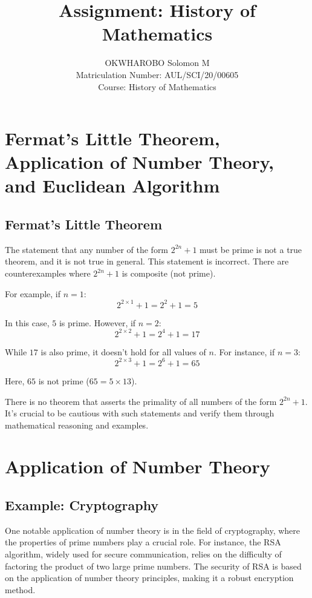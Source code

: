 \documentclass{article}
\begin{document}
\title{Assignment: History of Mathematics}
\author{OKWHAROBO Solomon M \\
        Matriculation Number: AUL/SCI/20/00605 \\
        Course: History of Mathematics}
\date{}
\maketitle

\section*{Fermat's Little Theorem, Application of Number Theory, and Euclidean Algorithm}

\subsection{Fermat's Little Theorem}

The statement that any number of the form $2^{2n} + 1$ must be prime is not a true theorem, and it is not true in general. This statement is incorrect. There are counterexamples where $2^{2n} + 1$ is composite (not prime).

For example, if $n = 1$:
\[2^{2 \times 1} + 1 = 2^2 + 1 = 5\]

In this case, $5$ is prime. However, if $n = 2$:
\[2^{2 \times 2} + 1 = 2^4 + 1 = 17\]

While $17$ is also prime, it doesn't hold for all values of $n$. For instance, if $n = 3$:
\[2^{2 \times 3} + 1 = 2^6 + 1 = 65\]

Here, $65$ is not prime ($65 = 5 \times 13$).

There is no theorem that asserts the primality of all numbers of the form $2^{2n} + 1$. It's crucial to be cautious with such statements and verify them through mathematical reasoning and examples.
\section{Application of Number Theory}

\subsection{Example: Cryptography}

One notable application of number theory is in the field of cryptography, where the properties of prime numbers play a crucial role. For instance, the RSA algorithm, widely used for secure communication, relies on the difficulty of factoring the product of two large prime numbers. The security of RSA is based on the application of number theory principles, making it a robust encryption method.
\end{document}
